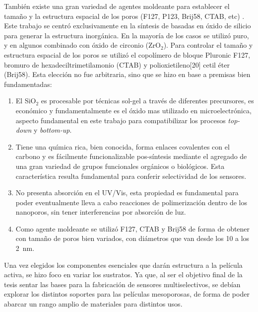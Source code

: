 	También existe una gran variedad de agentes moldeante para establecer el tamaño y la estructura espacial de los poros (F127, P123, Brij58, CTAB, etc) \cite{angelome2011,schuth2013,Soler-Illia2006,Soler-Illia2002a}. Este trabajo se centró exclusivamente en la síntesis de \pdm\space basadas en óxido de silicio para generar la estructura inorgánica. En la mayoría de los casos se utilizó puro, y en algunos combinado con óxido de circonio (ZrO$_2$). Para controlar el tamaño y estructura espacial de los poros se utilizó el copolímero de bloque Pluronic F127, bromuro de hexadeciltrimetilamonio (CTAB) y polioxietileno[20] cetil éter (Brij58). Esta elección no fue arbitraria, sino que se hizo en base a premisas bien fundamentadas:
		
		\begin{enumerate}

		\item El SiO$_2$ es procesable por técnicas sol-gel a través de diferentes precursores, es económico y fundamentalmente es el óxido mas utilizado en microelectrónica, aspecto fundamental en este trabajo para compatibilizar los procesos \textit{top-down} y \textit{bottom-up}.

		\item Tiene una química rica, bien conocida, forma enlaces covalentes con el carbono y es fácilmente funcionalizable pos-síntesis mediante el agregado de una gran variedad de grupos funcionales orgánicos o biológicos. Esta característica resulta fundamental para conferir selectividad de los sensores.

		\item No presenta absorción en el UV/Vis, esta propiedad es fundamental para poder eventualmente lleva a cabo reacciones de polimerización dentro de los nanoporos, sin tener interferencias por absorción de luz.

		\item Como agente moldeante se utilizó F127, CTAB y Brij58 de forma de obtener \pdm\space con tamaño de poros bien variados, con diámetros que van desde los 10 a los \SI{2}{\nm}.

		\end{enumerate}
	
	Una vez elegidos los componentes esenciales que darán estructura a la película activa, se hizo foco en variar los sustratos. Ya que, al ser el objetivo final de la tesis sentar las bases para la fabricación de sensores multiselectivos, se debían explorar los distintos soportes para las películas mesoporosas, de forma de poder abarcar un rango amplio de materiales para distintos usos.

